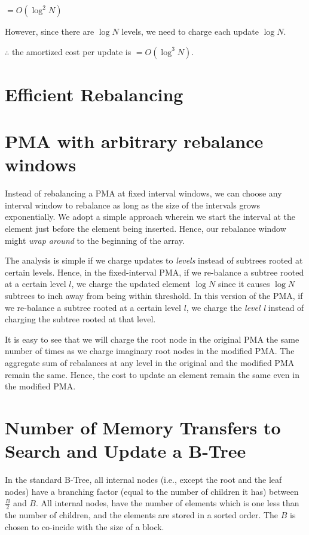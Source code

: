 \documentclass{article}
\begin{document}
$= O(\log^2{N})$

However, since there are $\log{N}$ levels, we need to charge each update $\log{N}$.

$\therefore$ the amortized cost per update is $= O(\log^3{N})$.


\section{Efficient Rebalancing}

\section{PMA with arbitrary rebalance windows}

Instead of rebalancing a PMA at fixed interval windows, we can choose
any interval window to rebalance as long as the size of the intervals
grows exponentially. We adopt a simple approach wherein we start the
interval at the element just before the element being inserted. Hence,
our rebalance window might \textit{wrap around} to the beginning of
the array.

The analysis is simple if we charge updates to \textit{levels} instead
of subtrees rooted at certain levels. Hence, in the fixed-interval
PMA, if we re-balance a subtree rooted at a certain level $l$, we
charge the updated element $\log{N}$ since it causes $\log{N}$
subtrees to inch away from being within threshold. In this version of
the PMA, if we re-balance a subtree rooted at a certain level $l$, we
charge the \textit{level l} instead of charging the subtree rooted at
that level.

It is easy to see that we will charge the root node in the original
PMA the same number of times as we charge imaginary root nodes in the
modified PMA. The aggregate sum of rebalances at any level in the
original and the modified PMA remain the same. Hence, the cost to
update an element remain the same even in the modified PMA.

\clearpage


\section {Number of Memory Transfers to Search and Update a B-Tree}
In the standard B-Tree, all internal nodes (i.e., except the root and 
the leaf nodes) have a branching factor (equal to the number of children it has) 
between $\frac{B}{2}$ and $B$. All internal nodes, have the number of
elements which is one less than the number of children, and the elements
are stored in a sorted order. The $B$ is chosen to co-incide with the size of
a block.
\end{document}
